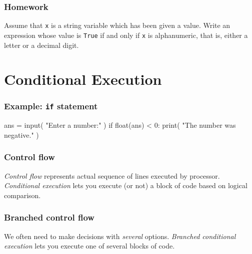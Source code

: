 \documentclass[11pt]{beamer}
\begin{document}
\begin{frame}[fragile]
  \frametitle{Homework}
  \Enlarge

  Assume that \texttt{x} is a string variable which has been given a value. Write an expression whose value is \texttt{True} if and only if \texttt{x} is alphanumeric, that is, either a letter or a decimal digit.
\end{frame}

\section{Conditional Execution}

\begin{frame}[fragile]
  \frametitle{Example:  \texttt{if} statement}
  \Enlarge

  \begin{semiverbatim}
ans = input( "Enter a number:" )
if float(ans) < 0:
    print( "The number was negative." )
  \end{semiverbatim}
\end{frame}

\begin{frame}[fragile]
  \frametitle{Control flow}
  \Enlarge

  \begin{itemize}
  \myitem  \emph{Control flow} represents actual sequence of lines executed by processor. %
  \myitem  \emph{Conditional execution} lets you execute (or not) a block of code based on logical comparison.
  \end{itemize}
\end{frame}

\begin{frame}[fragile]
  \frametitle{Branched control flow}
  \Enlarge

  \begin{itemize}
  \myitem  We often need to make decisions with \emph{several} options. %
  \myitem  \emph{Branched conditional execution} lets you execute one of several blocks of code.
  \end{itemize}
\end{frame}
\end{document}
